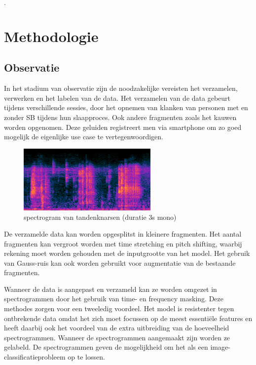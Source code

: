 \documentclass{hogent-article}
\begin{document}
.


\section{Methodologie}

\subsection{Observatie}

In het stadium van observatie zijn de noodzakelijke vereisten het verzamelen, verwerken en het labelen van de data. Het verzamelen van de data gebeurt tijdens verschillende sessies, door het opnemen van  klanken van personen met en zonder SB tijdens hun slaapproces.  Ook andere fragmenten zoals het kauwen worden opgenomen. Deze geluiden registreert men via smartphone om zo goed mogelijk de eigenlijke use case te vertegenwoordigen.



\begin{figure}[h!]
    \centering
    \includegraphics[width=0.7\linewidth]{brux_spec}
    \caption{ spectrogram van tandenknarsen (duratie 3s mono)}
    \label{fig:mil spectrogram of teeth grinding (duration 3s)}
\end{figure}
\noindent
De verzamelde data kan worden opgesplitst in kleinere fragmenten.
Het aantal fragmenten kan vergroot worden met time stretching en pitch shifting, waarbij rekening moet worden gehouden met de inputgrootte van het model. Het gebruik van Gauss-ruis kan ook worden gebruikt voor augmentatie van de bestaande fragmenten.




\bigbreak
\noindent
Wanneer de data is aangepast en verzameld kan ze worden omgezet in spectrogrammen door het gebruik van time- en frequency masking. Deze methodes zorgen voor een tweeledig voordeel.  Het model is resistenter tegen ontbrekende data omdat het zich moet focussen op de meest essentiële features en heeft daarbij ook het voordeel van de extra uitbreiding van de hoeveelheid spectrogrammen. Wanneer de spectrogrammen  aangemaakt zijn worden ze gelabeld. De spectrogrammen geven de mogelijkheid om het als een image-classiﬁcatieprobleem op te lossen.
\end{document}
